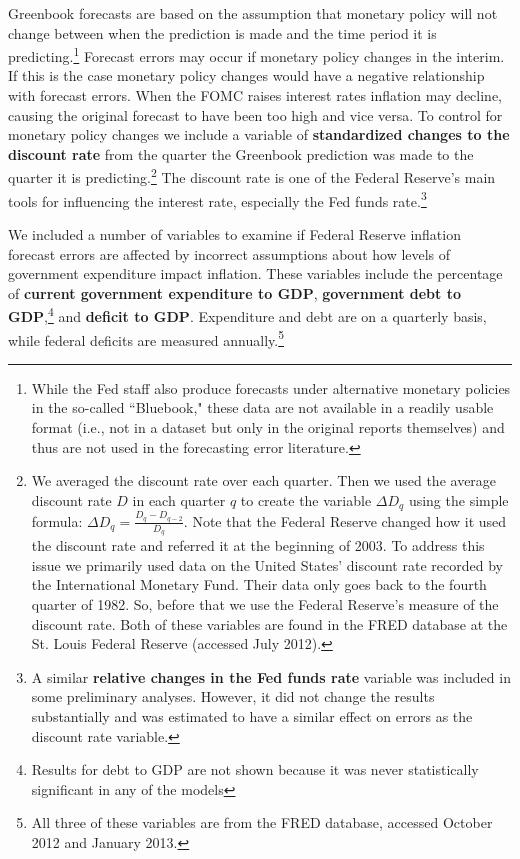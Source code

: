 \documentclass[a4paper]{article}\usepackage{graphicx, color}
\begin{document}
Greenbook forecasts are based on the assumption that monetary policy will not change between when the prediction is made and the time period it is predicting.\footnote{While the Fed staff also produce forecasts under alternative monetary policies in the so-called ``Bluebook," these data are not available in a readily usable format (i.e., not in a dataset but only in the original reports themselves) and thus are not used in the forecasting error literature.} Forecast errors may occur if monetary policy changes in the interim. If this is the case monetary policy changes would have a negative relationship with forecast errors. When the FOMC raises interest rates inflation may decline, causing the original forecast to have been too high and vice versa. To control for monetary policy changes we include a variable of {\bf{standardized changes to the discount rate}} from the quarter the Greenbook prediction was made to the quarter it is predicting.\footnote{We averaged the discount rate over each quarter. Then we used the average discount rate $D$ in each quarter $q$ to create the variable $\Delta D_{q}$ using the simple formula: $\Delta D_{q} = \frac{D_{q} - D_{q-2}}{D_{q}}$. Note that the Federal Reserve changed how it used the discount rate and referred it at the beginning of 2003. To address this issue we primarily used data on the United States' discount rate recorded by the International Monetary Fund. Their data only goes back to the fourth quarter of 1982. So, before that we use the Federal Reserve's measure of the discount rate. Both of these variables are found in the FRED database at the St. Louis Federal Reserve (accessed July 2012). } The discount rate is one of the Federal Reserve's main tools for influencing the interest rate, especially the Fed funds rate.\footnote{A similar {\bf{relative changes in the Fed funds rate}} variable was included in some preliminary analyses. However, it did not change the results substantially and was estimated to have a similar effect on errors as the discount rate variable.}

We included a number of variables to examine if Federal Reserve inflation forecast errors are affected by incorrect assumptions about how levels of government expenditure impact inflation. These variables include the percentage of {\bf{current government expenditure to GDP}}, {\bf{government debt to GDP}},\footnote{Results for debt to GDP are not shown because it was never statistically significant in any of the models} and \textbf{deficit to GDP}. Expenditure and debt are on a quarterly basis, while federal deficits are measured annually.\footnote{All three of these variables are from the FRED database, accessed October 2012 and January 2013.}
\end{document}
